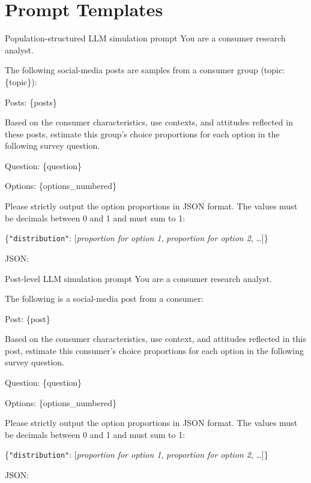 \documentclass{article}
\begin{document}
\section{Prompt Templates}
\label{app:prompts}

\begin{promptbox}[label={prompt:cluster-llm}]{Population-structured LLM simulation prompt}
You are a consumer research analyst.

The following social-media posts are samples from a consumer group
(topic: \{topic\}):

Posts: \{posts\}

Based on the consumer characteristics, use contexts, and attitudes reflected in
these posts, estimate this group's choice proportions for each option in the
following survey question.

Question: \{question\}

Options: \{options\_numbered\}

Please strictly output the option proportions in JSON format. The values must be
decimals between 0 and 1 and must sum to 1:

\{\texttt{"distribution"}: [\textit{proportion for option 1},
\textit{proportion for option 2}, \ldots]\}

JSON:
\end{promptbox}

\begin{promptbox}[label={prompt:post-llm}]{Post-level LLM simulation prompt}
You are a consumer research analyst.

The following is a social-media post from a consumer:

Post: \{post\}

Based on the consumer characteristics, use context, and attitudes reflected in
this post, estimate this consumer's choice proportions for each option in the
following survey question.

Question: \{question\}

Options: \{options\_numbered\}

Please strictly output the option proportions in JSON format. The values must be
decimals between 0 and 1 and must sum to 1:

\{\texttt{"distribution"}: [\textit{proportion for option 1},
\textit{proportion for option 2}, \ldots]\}

JSON:
\end{promptbox}


\newpage

\end{document}
